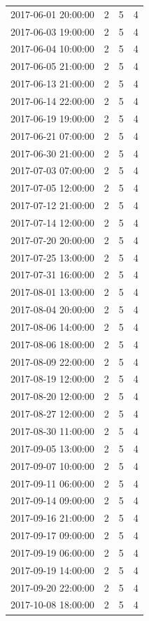 \begin{tabular}{lrrr}
2017-06-01 20:00:00 & 2 & 5 & 4 \\
2017-06-03 19:00:00 & 2 & 5 & 4 \\
2017-06-04 10:00:00 & 2 & 5 & 4 \\
2017-06-05 21:00:00 & 2 & 5 & 4 \\
2017-06-13 21:00:00 & 2 & 5 & 4 \\
2017-06-14 22:00:00 & 2 & 5 & 4 \\
2017-06-19 19:00:00 & 2 & 5 & 4 \\
2017-06-21 07:00:00 & 2 & 5 & 4 \\
2017-06-30 21:00:00 & 2 & 5 & 4 \\
2017-07-03 07:00:00 & 2 & 5 & 4 \\
2017-07-05 12:00:00 & 2 & 5 & 4 \\
2017-07-12 21:00:00 & 2 & 5 & 4 \\
2017-07-14 12:00:00 & 2 & 5 & 4 \\
2017-07-20 20:00:00 & 2 & 5 & 4 \\
2017-07-25 13:00:00 & 2 & 5 & 4 \\
2017-07-31 16:00:00 & 2 & 5 & 4 \\
2017-08-01 13:00:00 & 2 & 5 & 4 \\
2017-08-04 20:00:00 & 2 & 5 & 4 \\
2017-08-06 14:00:00 & 2 & 5 & 4 \\
2017-08-06 18:00:00 & 2 & 5 & 4 \\
2017-08-09 22:00:00 & 2 & 5 & 4 \\
2017-08-19 12:00:00 & 2 & 5 & 4 \\
2017-08-20 12:00:00 & 2 & 5 & 4 \\
2017-08-27 12:00:00 & 2 & 5 & 4 \\
2017-08-30 11:00:00 & 2 & 5 & 4 \\
2017-09-05 13:00:00 & 2 & 5 & 4 \\
2017-09-07 10:00:00 & 2 & 5 & 4 \\
2017-09-11 06:00:00 & 2 & 5 & 4 \\
2017-09-14 09:00:00 & 2 & 5 & 4 \\
2017-09-16 21:00:00 & 2 & 5 & 4 \\
2017-09-17 09:00:00 & 2 & 5 & 4 \\
2017-09-19 06:00:00 & 2 & 5 & 4 \\
2017-09-19 14:00:00 & 2 & 5 & 4 \\
2017-09-20 22:00:00 & 2 & 5 & 4 \\
2017-10-08 18:00:00 & 2 & 5 & 4 \\

\end{tabular}
